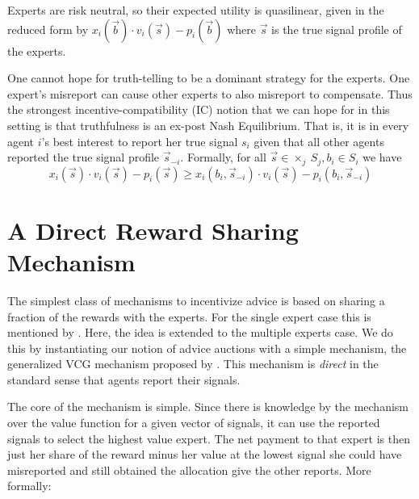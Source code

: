 Experts are risk neutral, so their expected utility is quasilinear, given in the reduced form by $x_i (\vec{b}) \cdot v_i(\vec{s}) - p_i(\vec{b})$ where $\vec{s}$ is the true signal profile of the experts.


One cannot hope for truth-telling to be a dominant strategy for the experts. One expert's misreport can cause other experts to also misreport to compensate. Thus the strongest incentive-compatibility (IC) notion that we can hope for in this setting is that truthfulness is an ex-post Nash Equilibrium. That is, it is in every agent $i$'s best interest to report her true signal $s_i$ given that all other agents reported the true signal profile $\vec{s}_{-i}$. Formally, for all $\vec{s} \in \times _{j} \  S_j, b_i \in S_i$ we have
$$x_i(\vec{s}) \cdot v_i(\vec{s}) - p_i(\vec{s}) \geq x_i(b_i, \vec{s}_{-i}) \cdot v_i(\vec{s}) - p_i(b_i, \vec{s}_{-i})$$





\section{A Direct Reward Sharing Mechanism}

The simplest class of mechanisms to incentivize advice is based on sharing a fraction of the rewards with the experts. For the single expert case this is mentioned by \cite{othman2010decision}. Here, the idea is extended to the multiple experts case. We do this by instantiating our notion of advice auctions with a simple mechanism,
the generalized VCG mechanism proposed by \cite{maskin1992auctions}. This mechanism is \emph{direct} in the standard sense that agents report their signals. 

The core of the mechanism is simple. Since there is knowledge by the mechanism over the value function for a given vector of signals, it can use the reported signals to select the highest value expert. The net payment to that expert is then just her share of the reward minus her value at the lowest signal she could have misreported and still obtained the allocation give the other reports. More formally:

